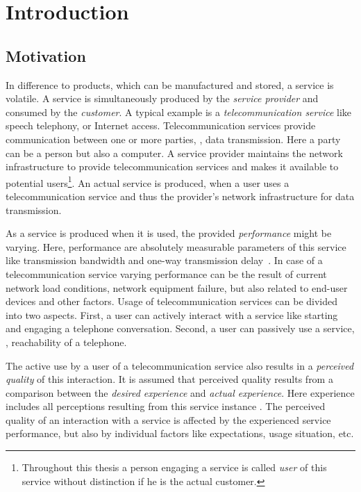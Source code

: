 \chapter{Introduction}\label{chap:01}

\section{Motivation}
In difference to products, which can be manufactured and stored, a service is volatile.
A service is simultaneously produced by the \emph{service provider} and consumed by the \emph{customer}.
A typical example is a \emph{telecommunication service} like speech telephony, or Internet access.
Telecommunication services provide communication between one or more parties, \ie, data transmission.
Here a party can be a person but also a computer.
A service provider maintains the network infrastructure to provide telecommunication services and makes it available to potential users\footnote{Throughout this thesis a person engaging a service is called \emph{user} of this service without distinction if he is the actual customer.}.
An actual service is produced, when a user uses a telecommunication service and thus the provider's network infrastructure for data transmission.

As a service is produced when it is used, the provided \emph{performance} might be varying.
Here, performance are absolutely measurable parameters of this service like transmission bandwidth and one-way transmission delay~\citep[\cf,][p. 12]{moller_assessment_2000}.
In case of a telecommunication service varying performance can be the result of current network load conditions, network equipment failure, but also related to end-user devices and other factors.
Usage of telecommunication services can be divided into two aspects.
First, a user can actively interact with a service like starting and engaging a telephone conversation.
Second, a user can passively use a service, \eg, reachability of a telephone.

The active use by a user of a telecommunication service also results in a \emph{perceived quality} of this interaction.
It is assumed that perceived quality results from a comparison between the \emph{desired experience} and \emph{actual experience}. %
Here experience includes all perceptions resulting from this service instance \citep[\cf,][p.13]{raake_quality_2014}.
The perceived quality of an interaction with a service is affected by the experienced service performance, but also by individual factors like expectations, usage situation, etc.

